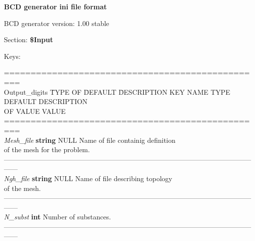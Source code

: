 \documentclass[a4paper]{article}
\begin{document}
\Large
\begin{flushleft}
\textbf{BCD generator ini file format}


\normalsize
BCD generator version: 1.00 stable
\vspace{20pt}

Section: \textbf{\$Input}

Keys:
\end{flushleft}
\vspace{-20pt}
\small
\begin{tabbing}
=================================================\\
Output\_digits	\quad 	\= TYPE OF \quad \= DEFAULT	\quad 	\=DESCRIPTION\kill
KEY NAME	 			 				\> TYPE		 				\> DEFAULT	 				\>DESCRIPTION\\
												\> OF VALUE				\> VALUE						\>\\
=================================================\\
\textit{Mesh\_file}	\> \textbf{string}	\> NULL		\>Name of file containig definition\\
								 		\> 									\> 				\>of the mesh for the problem.\\
------------------------------------------------------------------------------------------------------------------\\
\textit{Ngh\_file} 	\> \textbf{string} 	\> NULL		\>Name of file describing topology\\
								 		\> 									\> 				\>of the mesh.\\
------------------------------------------------------------------------------------------------------------------\\
\textit{N\_subst}		\> \textbf{int}						\>Number of substances.\\
------------------------------------------------------------------------------------------------------------------\\
\end{tabbing}

\normalsize
\end{document}
